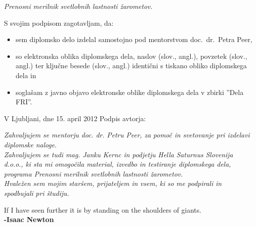 \documentclass[oneside, a4paper, 12pt]{book}
\newcommand{\clearemptydoublepage}{\newpage{\pagestyle{empty}\cleardoublepage}}
\begin{document}
\vspace{0.5cm}
\emph{Prenosni merilnik svetlobnih lastnosti žarometov.}

\vspace{1.5cm}
\noindent S svojim podpisom zagotavljam, da:
\begin{itemize}
	\item sem diplomsko delo izdelal samostojno pod mentorstvom 
		doc.\ dr.\ Petra Peer,

	\item	so elektronska oblika diplomskega dela, naslov (slov., angl.), povzetek (slov., angl.) ter ključne besede (slov., angl.) identični s tiskano obliko diplomskega dela in
	\item soglašam z javno objavo elektronske oblike diplomskega dela v zbirki ''Dela FRI''.
\end{itemize}

\vspace{1cm}
\noindent V Ljubljani, dne 15. april 2012 \hfill Podpis avtorja:

\clearemptydoublepage

\thispagestyle{empty}\mbox{}\vfill\null\it%
Zahvaljujem se mentorju doc. dr. Petru Peer, za pomoč in svetovanje pri izdelavi diplomske naloge. \\
Zahvaljujem se tudi mag. Janku Kernc in podjetju Hella Saturnus Slovenija d.o.o., ki sta mi omogočila material, izvedbo in testiranje diplomskega dela, programa Prenosni merilnik svetlobnih lastnosti žarometov. \\
Hvaležen sem mojim staršem, prijateljem in vsem, ki so me podpirali in spodbujali pri študiju.
\rm\normalfont

\clearemptydoublepage

\thispagestyle{empty}\mbox{}{\textheight}\mbox{}\hfill\begin{minipage}{0.90\textwidth}%
\begin{flushright}
If I have seen further it is by standing on the shoulders of giants.\\
\textbf{-Isaac Newton}
\end{flushright}
\normalfont\end{minipage}
 
\clearemptydoublepage

\def\thepage{}%
\tableofcontents{}
\end{document}
